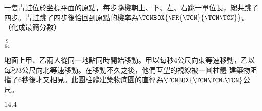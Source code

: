 \begin{QUESTION}
    \begin{QBODY}
         一隻青蛙位於坐標平面的原點，每步隨機朝上、下、左、右跳一單位長，總共跳了四步。青蛙跳了四步後恰回到原點的機率為$\TCNBOX{\FR{\TCN}{\TCN\TCN}}$。（化成最簡分數）
    \end{QBODY}
    \begin{QFROMS}
    \end{QFROMS}
    \begin{QTAGS}
    \end{QTAGS}
    \begin{QANS}
        $\frac{9}{64}$
    \end{QANS}
    \begin{QSOL}
    \end{QSOL}
    \begin{QEMPTYSPACE}
    \end{QEMPTYSPACE}
\end{QUESTION}
\begin{QUESTION}
    \begin{QBODY}
        地面上甲、乙兩人從同一地點同時開始移動。甲以每秒4公尺向東等速移動，乙以每秒3公尺向北等速移動。在移動不久之後，他們互望的視線被一圓柱體 建築物阻擋了6秒後才又相見。此圓柱體建築物底圓的直徑為$\TCNBOX{\TCN\TCN.\TCN}$公尺。
    \end{QBODY}
    \begin{QFROMS}
    \end{QFROMS}
    \begin{QTAGS}
    \end{QTAGS}
    \begin{QANS}
        $14.4$
    \end{QANS}
    \begin{QSOL}
    \end{QSOL}
    \begin{QEMPTYSPACE}
    \end{QEMPTYSPACE}
\end{QUESTION}